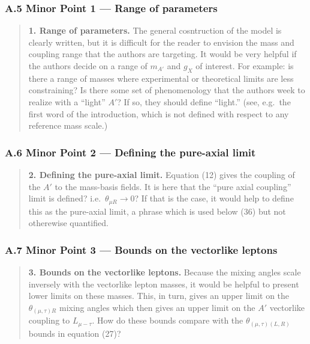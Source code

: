 \documentclass[
]{article}
\begin{document}
\subsubsection{A.5 Minor Point 1 --- Range of
parameters}\label{a.5-minor-point-1-range-of-parameters}

\begin{quote}
\textbf{1. Range of parameters.} The general cosntruction of the model
is clearly written, but it is difficult for the reader to envision the
mass and coupling range that the authors are targeting. It would be very
helpful if the authors decide on a range of \(m_{A'}\) and \(g_X\) of
interest. For example: is there a range of masses where experimental or
theoretical limits are less constraining? Is there some set of
phenomenology that the authors week to realize with a ``light'' \(A'\)?
If so, they should define ``light.'' (see, e.g.~the first word of the
introduction, which is not defined with respect to any reference mass
scale.)
\end{quote}

\subsubsection{A.6 Minor Point 2 --- Defining the pure-axial
limit}\label{a.6-minor-point-2-defining-the-pure-axial-limit}

\begin{quote}
\textbf{2. Defining the pure-axial limit.} Equation (12) gives the
coupling of the \(A'\) to the mass-basis fields. It is here that the
``pure axial coupling'' limit is defined? i.e.~\(\theta_{\mu R}\to0\)?
If that is the case, it would help to define this as the pure-axial
limit, a phrase which is used below (36) but not otherewise quantified.
\end{quote}

\subsubsection{A.7 Minor Point 3 --- Bounds on the vectorlike
leptons}\label{a.7-minor-point-3-bounds-on-the-vectorlike-leptons}

\begin{quote}
\textbf{3. Bounds on the vectorlike leptons.} Because the mixing angles
scale inversely with the vectorlike lepton masses, it would be helpful
to present lower limits on these masses. This, in turn, gives an upper
limit on the \(\theta_{(\mu,\tau)R}\) mixing angles which then gives an
upper limit on the \(A'\) vectorlike coupling to \(L_{\mu-\tau}\). How
do these bounds compare with the \(\theta_{(\mu,\tau)(L,R)}\) bounds in
equation (27)?
\end{quote}
\end{document}

